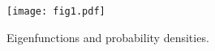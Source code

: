 \begin{frame}{\sec}
    \begin{figure}[tb!]
        \centering
        \texttt{[image: fig1.pdf]}
        \caption{Eigenfunctions and probability densities.}
        \label{fig:fig1_pdf}
    \end{figure}
\end{frame}
